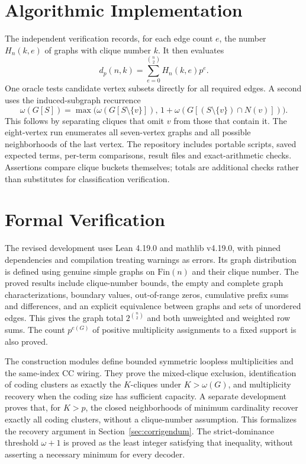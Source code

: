 \documentclass[11pt,a4paper]{article}
\theoremstyle{definition}
\begin{document}
\section{Algorithmic Implementation}
The independent verification records, for each edge count $e$, the
number $H_n(k,e)$ of graphs with clique number $k$. It then evaluates
\[
 d_p(n,k)=\sum_{e=0}^{\binom n2}H_n(k,e)p^e.
\]
One oracle tests candidate vertex subsets directly for all required
edges. A second uses the induced-subgraph recurrence
\[
 \omega(G[S])=\max\bigl(\omega(G[S\setminus\{v\}]),\,
 1+\omega(G[(S\setminus\{v\})\cap N(v)])\bigr).
\]
This follows by separating cliques that omit $v$ from those that
contain it. The eight-vertex run enumerates all seven-vertex graphs
and all possible neighborhoods of the last vertex.
The repository includes portable scripts, saved expected terms,
per-term comparisons, result files and exact-arithmetic checks.
Assertions compare clique buckets themselves; totals are additional
checks rather than substitutes for classification verification.

\section{Formal Verification}
The revised development uses Lean 4.19.0 and mathlib v4.19.0,
with pinned dependencies and compilation treating warnings as errors.
Its graph distribution is defined using genuine simple graphs on
$\mathrm{Fin}(n)$ and their clique number. The proved results include
clique-number bounds, the empty and complete graph characterizations,
boundary values, out-of-range zeros, cumulative prefix sums and
differences, and an explicit equivalence between graphs and sets of
unordered edges. This gives the graph total $2^{\binom n2}$ and both
unweighted and weighted row sums. The count $p^{e(G)}$ of positive
multiplicity assignments to a fixed support is also proved.

The construction modules define bounded symmetric loopless
multiplicities and the same-index CC wiring. They prove the
mixed-clique exclusion, identification of coding clusters as exactly
the $K$-cliques under $K>\omega(G)$, and multiplicity recovery when
the coding size has sufficient capacity. A separate development
proves that, for $K>p$, the closed neighborhoods of minimum
cardinality recover exactly all coding clusters, without a
clique-number assumption. This formalizes the recovery argument in
Section~\ref{sec:corrigendum}. The strict-dominance threshold
$\omega+1$ is proved as the least integer satisfying that inequality,
without asserting a necessary minimum for every decoder.
\end{document}
